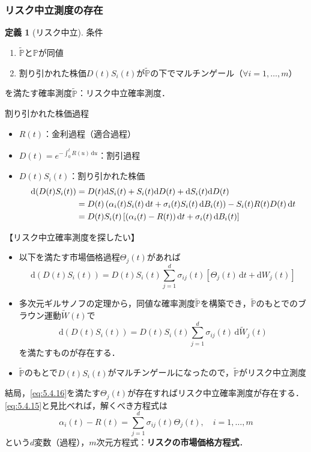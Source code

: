 \documentclass[a4paper, lualatex, ja=standard]{bxjsarticle}
\theoremstyle{definition}
\newtheorem{dfn}[thm]{定義}
\renewcommand{\P}{\mathbb{P}}
\newcommand{\PP}{\widetilde{\mathbb{P}}}
\newcommand{\WW}{\widetilde{W}}
\newcommand{\diff}{\mathrm{d}}
\begin{document}
\subsubsection{リスク中立測度の存在}
\begin{dfn}[リスク中立]
  条件
  \begin{enumerate}
    \item $\PP$と$\P$が同値
    \item 割り引かれた株価$D(t)S_i(t)$が$\PP$の下でマルチンゲール（$\forall i=1,\ldots,m$）
  \end{enumerate}
  を満たす確率測度$\PP$：リスク中立確率測度．
\end{dfn}
割り引かれた株価過程
\begin{itemize}
  \item $R(t)$：金利過程（適合過程）
  \item $D(t) = e^{-\int_0^t R(u)\,\diff u}$：割引過程
  \item $D(t)S_i(t)$：割り引かれた株価
  \setcounter{equation}{14}
  \begin{align}
    \diff(D(t)S_i(t)) &= D(t)\diff S_i(t)+S_i(t)\diff D(t)+\diff S_i(t)\diff D(t)\notag\\
    &= D(t)\left(\alpha_i(t)S_i(t)\,\diff t+\sigma_i(t)S_i(t)\,\diff B_i(t)\right)-S_i(t)R(t)D(t)\,\diff t\notag\\
    &= D(t)S_i(t)\left[(\alpha_i(t)-R(t))\,\diff t+\sigma_i(t)\,\diff B_i(t)\right]\label{eq:5.4.15}
  \end{align}
\end{itemize}

【リスク中立確率測度を探したい】
\begin{itemize}
  \item 以下を満たす市場価格過程$\Theta_{j}(t)$があれば
  \begin{equation}
    \diff(D(t)S_i(t)) = D(t)S_i(t)\sum_{j=1}^d\sigma_{ij}(t)[\Theta_{j}(t)\,\diff t+\diff W_j(t)]
    \label{eq:5.4.16}
  \end{equation}
  \item 多次元ギルサノフの定理から，同値な確率測度$\PP$を構築でき，$\PP$のもとでのブラウン運動$\WW(t)$で
  \begin{equation}
    \diff (D(t)S_i(t)) = D(t)S_i(t)\sum_{j=1}^d\sigma_{ij}(t)\,\diff \WW_j(t)
  \end{equation}
  を満たすものが存在する．
  \item $\PP$のもとで$D(t)S_i(t)$がマルチンゲールになったので，$\PP$がリスク中立測度
\end{itemize}
結局，\eqref{eq:5.4.16}を満たす$\Theta_{j}(t)$が存在すればリスク中立確率測度が存在する．
\eqref{eq:5.4.15}と見比べれば，解くべき方程式は
\begin{equation}
  \alpha_i(t)-R(t) = \sum_{j=1}^d\sigma_{ij}(t)\Theta_{j}(t),\quad i=1,\ldots,m
\end{equation}
という$d$変数（過程），$m$次元方程式：\textbf{リスクの市場価格方程式}．
\end{document}
